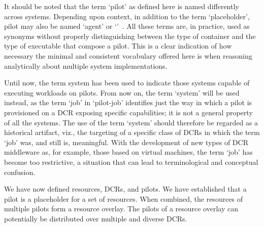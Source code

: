 \documentclass{sig-alternate}
\begin{document}
It should be noted that the term `pilot' as defined here is named differently
across \pilotjob systems. Depending upon context, in addition to the term
`placeholder', pilot may also be named `agent' or
`\pilotjob'~\cite{moscicki2011,pinchak2002}. All these terms are, in practice,
used as synonyms without properly distinguishing between the type of container
and the type of executable that compose a pilot. This is a clear indication of
how necessary the minimal and consistent vocabulary offered here is when
reasoning analytically about multiple \pilotjob system implementations.

Until now, the term \pilotjob system has been used to indicate those systems
capable of executing workloads on pilots. From now on, the term `\pilot system'
will be used instead, as the term `job' in `pilot-job' identifies just the way
in which a pilot is provisioned on a DCR exposing specific capabilities; it is
not a general property of all the \pilotjob systems. The use of the term
`\pilotjob system' should therefore be regarded as a historical artifact, viz.,
the targeting of a specific class of DCRs in which the term `job' was, and still
is, meaningful. With the development of new types of DCR middleware as, for
example, those based on virtual machines, the term `job' has become too
restrictive, a situation that can lead to terminological and conceptual
confusion.




We have now defined resources, DCRs, and pilots. We have established that a
pilot is a placeholder for a set of resources. When combined, the resources of
multiple pilots form a resource overlay. The pilots of a resource overlay can
potentially be distributed over multiple and diverse DCRs.

\end{document}
